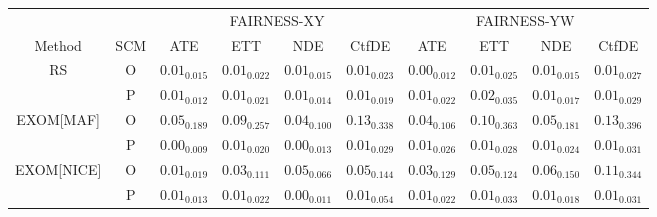 
\label{tab:93}
\centering
\begin{tabular}{cccccccccc}
    \toprule
    \multicolumn{2}{c}{} & \multicolumn{4}{c}{FAIRNESS-XY} & \multicolumn{4}{c}{FAIRNESS-YW}\\
    \cmidrule(r){3-6} \cmidrule(r){7-10}
    Method & SCM & ATE & ETT & NDE & CtfDE & ATE & ETT & NDE & CtfDE\\
    \midrule
    \multirow{2}{*}{RS} & O & $0.01_{0.015}$ & $0.01_{0.022}$ & $0.01_{0.015}$ & $0.01_{0.023}$ & $0.00_{0.012}$ & $0.01_{0.025}$ & $0.01_{0.015}$ & $0.01_{0.027}$\\
    & P & $0.01_{0.012}$ & $0.01_{0.021}$ & $0.01_{0.014}$ & $0.01_{0.019}$ & $0.01_{0.022}$ & $0.02_{0.035}$ & $0.01_{0.017}$ & $0.01_{0.029}$\\
    \midrule
    \multirow{2}{*}{EXOM[MAF]} & O & $0.05_{0.189}$ & $0.09_{0.257}$ & $0.04_{0.100}$ & $0.13_{0.338}$ & $0.04_{0.106}$ & $0.10_{0.363}$ & $0.05_{0.181}$ & $0.13_{0.396}$\\
    & P & $0.00_{0.009}$ & $0.01_{0.020}$ & $0.00_{0.013}$ & $0.01_{0.029}$ & $0.01_{0.026}$ & $0.01_{0.028}$ & $0.01_{0.024}$ & $0.01_{0.031}$\\
    \midrule
    \multirow{2}{*}{EXOM[NICE]} & O & $0.01_{0.019}$ & $0.03_{0.111}$ & $0.05_{0.066}$ & $0.05_{0.144}$ & $0.03_{0.129}$ & $0.05_{0.124}$ & $0.06_{0.150}$ & $0.11_{0.344}$\\
    & P & $0.01_{0.013}$ & $0.01_{0.022}$ & $0.00_{0.011}$ & $0.01_{0.054}$ & $0.01_{0.022}$ & $0.01_{0.033}$ & $0.01_{0.018}$ & $0.01_{0.031}$\\
    \bottomrule
\end{tabular}
